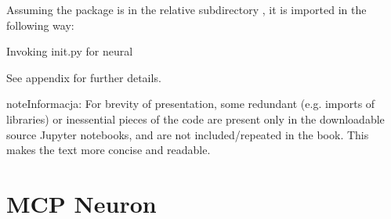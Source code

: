 \documentclass[a4paper,12pt,polish]{jupyterBook}
\begin{document}
\sphinxAtStartPar
Assuming the package is in the relative subdirectory , it is imported in the following way:
\begin{sphinxVerbatimInput}

\begin{sphinxVerbatim}[commandchars=\\\{\}]
                   
 

           
\end{sphinxVerbatim}
\end{sphinxVerbatimInput}
\begin{sphinxVerbatimOutput}

\begin{sphinxVerbatim}[commandchars=\\\{\}]
Invoking \PYGZus{}\PYGZus{}init\PYGZus{}\PYGZus{}.py for neural
\end{sphinxVerbatim}
\end{sphinxVerbatimOutput}

\sphinxAtStartPar
See appendix {\hyperref[\detokenize{docs/appendix:app-lab}]{}} for further details.

\begin{sphinxadmonition}{note}{Informacja:}
\sphinxAtStartPar
For brevity of presentation, some redundant (e.g. imports of libraries) or inessential pieces of the code are present only in the downloadable source Jupyter notebooks, and are not included/repeated in the book. This makes the text more concise and readable.
\end{sphinxadmonition}


\chapter{MCP Neuron}
\label{\detokenize{docs/mcp:mcp-neuron}}\label{\detokenize{docs/mcp:mcp-lab}}\label{\detokenize{docs/mcp::doc}}
\end{document}
